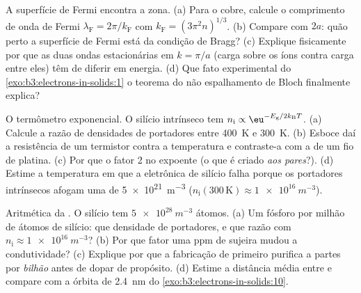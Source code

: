 \begin{exercise}[$\star\star$]\label{exo:b3:electrons-in-solids:7}
A superfície de Fermi encontra a zona. (a) Para o cobre, calcule o
comprimento de onda de Fermi $\lambda_{\text{F}} = 2\pi/k_{\text{F}}$ com
$k_{\text{F}} = (3\pi^2n)^{1/3}$. (b) Compare com $2a$: quão
perto a superfície de Fermi está da condição de Bragg? (c) Explique
fisicamente por que as duas ondas estacionárias em $k = \pi/a$ (carga
sobre os íons contra carga entre eles) têm de diferir em energia. (d) Que
fato experimental do \cref{exo:b3:electrons-in-solids:1} o
teorema do não espalhamento de Bloch finalmente explica?
\end{exercise}

\begin{exercise}[$\star\star$]\label{exo:b3:electrons-in-solids:8}
O termômetro exponencial. O silício intrínseco tem $n_{\text{i}}
\propto \eu^{-E_{\text{g}}/2k_{\text{B}}T}$. (a) Calcule a
razão de densidades de portadores entre \qty{400}{K} e \qty{300}{K}. (b)
Esboce daí a resistência de um termistor contra a temperatura e
contraste-a com a de um fio de platina. (c) Por que o fator 2 no
expoente (o que é criado \emph{aos pares}?). (d) Estime a
temperatura em que a eletrônica de silício falha porque os portadores
intrínsecos afogam uma  de \qty{5e21}{m^{-3}}
($n_{\text{i}}(300\,\text{K}) \approx \qty{1e16}{m^{-3}}$).
\end{exercise}

\begin{exercise}[$\star\star$]\label{exo:b3:electrons-in-solids:9}
Aritmética da . O silício tem $\qty{5e28}{m^{-3}}$ átomos. (a) Um
fósforo por milhão de átomos de silício: que densidade de portadores, e
que razão com $n_{\text{i}} \approx \qty{1e16}{m^{-3}}$? (b) Por
que fator uma ppm de sujeira mudou a condutividade? (c)
Explique por que a fabricação de  primeiro purifica a
partes por \emph{bilhão} antes de dopar de propósito. (d) Estime a
distância média entre  e compare com a órbita de
\qty{2.4}{nm} do \cref{exo:b3:electrons-in-solids:10}.
\end{exercise}

